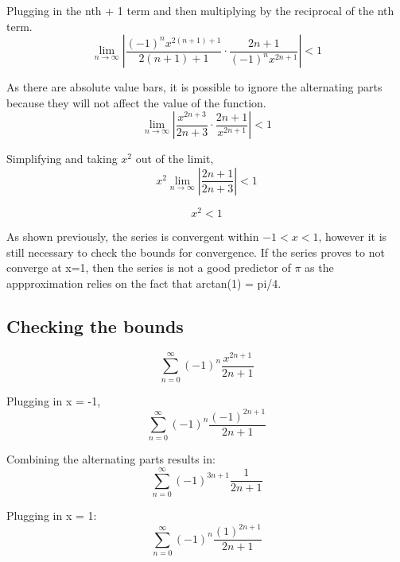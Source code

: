 \documentclass[12pt, titlepage]{article}
\begin{document}
Plugging in the nth + 1 term and then multiplying by the reciprocal of the nth term.
\begin{equation}
    \lim_{n \to \infty} \left |\frac{(-1)^{n}x^{2(n+1)+1}}{2(n+1)+1} \cdot \frac{2n+1}{(-1)^{n}x^{2n+1}} \right | < 1
\end{equation}

As there are absolute value bars, it is possible to ignore the alternating parts because they will not affect the value of the function.
\begin{equation}
    \lim_{n \to \infty} \left |\frac{x^{2n+3}}{2n+3} \cdot \frac{2n+1}{x^{2n+1}} \right | < 1
\end{equation}

Simplifying and taking \(x^{2}\) out of the limit,
\begin{equation}
    x^{2} \lim_{n \to \infty} \left |\frac{2n+1}{2n+3} \right | < 1
\end{equation}

\begin{equation}
    x^{2} < 1
\end{equation}

As shown previously, the series is convergent within \(-1 < x < 1\), however it is still necessary to check the bounds for convergence. If the series proves to not converge at x=1, then the series is not a good predictor of \(\pi\) as the appproximation relies on the fact that arctan(1) = pi/4.

\subsection{Checking the bounds}
\begin{equation}
    \sum_{n=0}^{\infty} (-1)^{n} \frac{x^{2n+1}}{2n+1}
\end{equation}

Plugging in x = -1,
\begin{equation}
    \sum_{n=0}^{\infty} (-1)^{n} \frac{(-1)^{2n+1}}{2n+1}
\end{equation}

Combining the alternating parts results in:
\begin{equation}
    \sum_{n=0}^{\infty} (-1)^{3n+1} \frac{1}{2n+1}
\end{equation}

Plugging in x = 1:
\begin{equation}
    \sum_{n=0}^{\infty} (-1)^{n} \frac{(1)^{2n+1}}{2n+1}
\end{equation}
\end{document}

